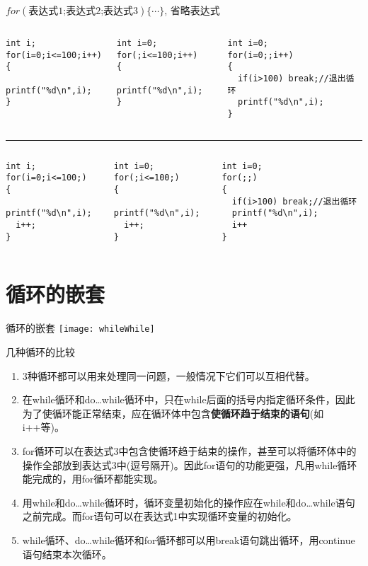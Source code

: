 \begin{frame}{$for(\text{表达式1;表达式2;表达式3}) \{\cdots\}$, 省略表达式}
\begin{columns}%
\begin{lstlisting} 
int i;
for(i=0;i<=100;i++)
{
  printf("%d\n",i);
}
\end{lstlisting}
\begin{lstlisting} 
int i=0;
for(;i<=100;i++)
{
  printf("%d\n",i);
}
\end{lstlisting}
\begin{lstlisting} 
int i=0;
for(i=0;;i++)
{
  if(i>100) break;//退出循环
  printf("%d\n",i);
}
\end{lstlisting}
\end{columns}
\rule{\textwidth}{1pt} %
\begin{columns}%
\begin{lstlisting} 
int i;
for(i=0;i<=100;)
{
  printf("%d\n",i);
  i++;
}
\end{lstlisting}
\begin{lstlisting} 
int i=0;
for(;i<=100;)
{
  printf("%d\n",i);
  i++;
}
\end{lstlisting}
\begin{lstlisting} 
int i=0;
for(;;)
{
  if(i>100) break;//退出循环  
  printf("%d\n",i);
  i++
}
\end{lstlisting}
\end{columns}
\end{frame}

\section{循环的嵌套}

\begin{frame}{循环的嵌套}
\centering
\texttt{[image: whileWhile]}
\end{frame}

\begin{frame}{几种循环的比较}
\begin{enumerate}
	\item 3种循环都可以用来处理同一问题，一般情况下它们可以互相代替。
	\item 在while循环和do…while循环中，只在while后面的括号内指定循环条件，因此为了使循环能正常结束，应在循环体中包含\textbf{使循环趋于结束的语句}(如i++等)。
	\item for循环可以在表达式3中包含使循环趋于结束的操作，甚至可以将循环体中的操作全部放到表达式3中(逗号隔开)。因此for语句的功能更强，凡用while循环能完成的，用for循环都能实现。
	\item 用while和do…while循环时，循环变量初始化的操作应在while和do…while语句之前完成。而for语句可以在表达式1中实现循环变量的初始化。
	\item while循环、do…while循环和for循环都可以用break语句跳出循环，用continue语句结束本次循环。	
\end{enumerate}
\end{frame}

